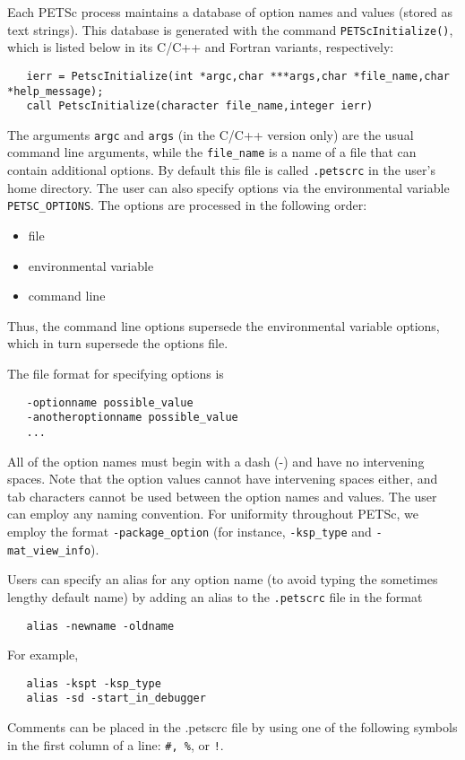 {Each PETSc process maintains a database of option names and values
(stored as text strings). This database is generated with the command
{\tt PETScInitialize()}, which is listed below in its C/C++ and
Fortran variants, respectively:
\begin{verbatim}
   ierr = PetscInitialize(int *argc,char ***args,char *file_name,char *help_message);
   call PetscInitialize(character file_name,integer ierr)
\end{verbatim}
The arguments {\tt argc} and {\tt args} (in the C/C++ version only) are
the usual command line arguments, while the {\tt file\_name} is a name of
a file that can contain additional options. 
By default this file is called {\tt .petscrc}  in the 
user's home directory.  The user can also specify options via the
environmental variable {\tt PETSC\_OPTIONS}.   
The options are processed in the following order:
\begin{itemize}
\item file
\item environmental variable
\item command line
\end{itemize}
Thus, the command line options supersede the environmental variable
options, which in turn supersede the options file.  

The file format for specifying options is 
\begin{verbatim}
   -optionname possible_value
   -anotheroptionname possible_value
   ...
\end{verbatim}
All of the option names must begin with a dash (-) and have no intervening 
spaces.  Note that the option values cannot
have intervening spaces either, and tab characters cannot be used
between the option names and values.
The user can employ any naming convention.  For uniformity throughout
PETSc, we employ the format {\tt -package\_option} (for instance, 
{\tt -ksp\_type} and {\tt -mat\_view\_info}).

Users can specify an alias for any option name (to avoid typing the 
sometimes lengthy default name) by adding an alias to the 
{\tt .petscrc}  file in the format
 
\begin{verbatim}
   alias -newname -oldname
\end{verbatim}
For example,
\begin{verbatim}
   alias -kspt -ksp_type
   alias -sd -start_in_debugger
\end{verbatim}
Comments can be placed in the .petscrc file by using one of the
following symbols in the first column of a line: {\tt \#, \%}, or {\tt !}.

}
